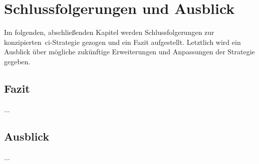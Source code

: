 
\section{Schlussfolgerungen und Ausblick} \label{sec:06-prospect}

Im folgenden, abschließenden Kapitel werden Schlussfolgerungen zur konzipierten\ \acrshort{ci}-Strategie gezogen
und ein Fazit aufgestellt.
Letztlich wird ein Ausblick über mögliche zukünftige Erweiterungen und Anpassungen der Strategie gegeben.

\subsection{Fazit} \label{subsec:06-prospect-1}

...

\subsection{Ausblick} \label{subsec:06-prospect-2}

...

\clearpage
